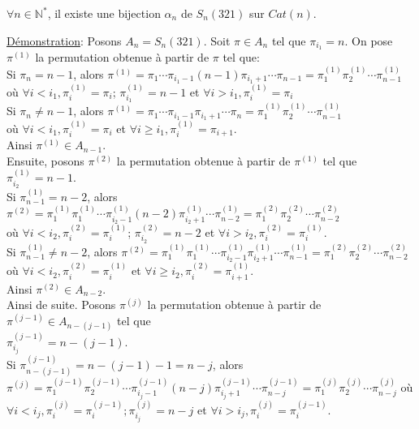 			\begin{proposition}
			 $\forall n \in \mathbb{N}^{*}$, il existe une bijection $\alpha_{n}$ de $S_{n}(321)$ sur $Cat(n).$
			\end{proposition}

			\underline{Démonstration}: Posons $A_{n} = S_{n}(321)$. Soit $\pi \in A_{n}$ tel que $\pi_{i_{1}}=n $. On pose $\pi^{(1)}$ la permutation obtenue à partir de $\pi$ tel que:\\
			Si $\pi_{n} = n-1 $, alors $\pi^{(1)} = \pi_{1} \cdots  \pi_{i_{1}-1} (n-1) \pi_{i_{1}+1} \cdots \pi_{n-1} = \pi_{1}^{(1)}\pi_{2}^{(1)} \cdots \pi_{n-1}^{(1)}$\\
			où $\forall i<i_{1}, \pi_{i}^{(1)} = \pi_{i}$; $\pi_{i_{1}}^{(1)} = n-1$ et  $\forall i>i_{1}, \pi_{i}^{(1)} = \pi_{i}$\\
			Si $\pi_{n} \neq n-1 $, alors $\pi^{(1)} = \pi_{1} \cdots  \pi_{i_{1}-1} \pi_{i_{1}+1} \cdots \pi_{n} = \pi_{1}^{(1)}\pi_{2}^{(1)} \cdots \pi_{n-1}^{(1)}$\\ où $\forall i<i_{1}, \pi_{i}^{(1)} = \pi_{i}$ et $\forall i\geq i_{1}, \pi_{i}^{(1)} = \pi_{i+1}$.\\
			Ainsi $\pi^{(1)} \in A_{n-1}$.\\
			Ensuite, posons $\pi^{(2)}$ la permutation obtenue à partir de $\pi^{(1)}$ tel que $\pi_{i_{2}}^{(1)} = n-1$.\\
			Si $\pi_{n-1}^{(1)} = n-2 $, alors  $\pi^{(2)} = \pi_{1}^{(1)}\pi_{1}^{(1)} \cdots \pi_{i_{2}-1}^{(1)} (n-2) \pi_{i_{2}+1}^{(1)} \cdots \pi_{n-2}^{(1)} = \pi_{1}^{(2)}\pi_{2}^{(2)} \cdots \pi_{n-2}^{(2)} $\\ 
			où $\forall i<i_{2}, \pi_{i}^{(2)} = \pi_{i}^{(1)}$; $\pi_{i_{2}}^{(2)} = n-2$ et  $\forall i>i_{2}, \pi_{i}^{(2)} = \pi_{i}^{(1)}$.\\
			Si $\pi_{n-1}^{(1)} \neq n-2 $, alors $\pi^{(2)} = \pi_{1}^{(1)}\pi_{1}^{(1)} \cdots \pi_{i_{2}-1}^{(1)}\pi_{i_{2}+1}^{(1)} \cdots \pi_{n-1}^{(1)} = \pi_{1}^{(2)}\pi_{2}^{(2)} \cdots \pi_{n-2}^{(2)} $\\
			où $\forall i<i_{2}, \pi_{i}^{(2)} = \pi_{i}^{(1)}$ et $\forall i\geq i_{2}, \pi_{i}^{(2)} = \pi_{i+1}^{(1)}$.\\
			Ainsi $\pi^{(2)} \in A_{n-2}$.\\
			Ainsi de suite. Posons $\pi^{(j)}$ la permutation obtenue à partir de $\pi^{(j-1)} \in A_{n-(j-1)} $ tel que\\ $\pi_{i_{j}}^{(j-1)} = n-(j-1) $.\\
			Si $\pi_{n-(j-1)}^{(j-1)} = n-(j-1)-1 = n-j $, alors $\pi^{(j)} = \pi_{1}^{(j-1)}\pi_{2}^{(j-1)} \cdots \pi_{i_{j}-1}^{(j-1)} (n-j) \pi_{i_{j}+1}^{(j-1)} \cdots \pi_{n-j}^{(j-1)} = \pi_{1}^{(j)}\pi_{2}^{(j)} \cdots \pi_{n-j}^{(j)} $ où $\forall i<i_{j}, \pi_{i}^{(j)}=\pi_{i}^{(j-1)}; \pi_{i_{j}}^{(j)}=n-j $ et $\forall i>i_{j},\pi_{i}^{(j)}=\pi_{i}^{(j-1)}$.\\
